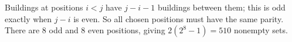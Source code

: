 Buildings at positions $i<j$ have $j-i-1$ buildings between them; this is odd exactly when $j-i$ is even. So all chosen positions must have the same parity. There are $8$ odd and $8$ even positions, giving $2\left(2^8-1\right)=\boxed{510}$ nonempty sets.

